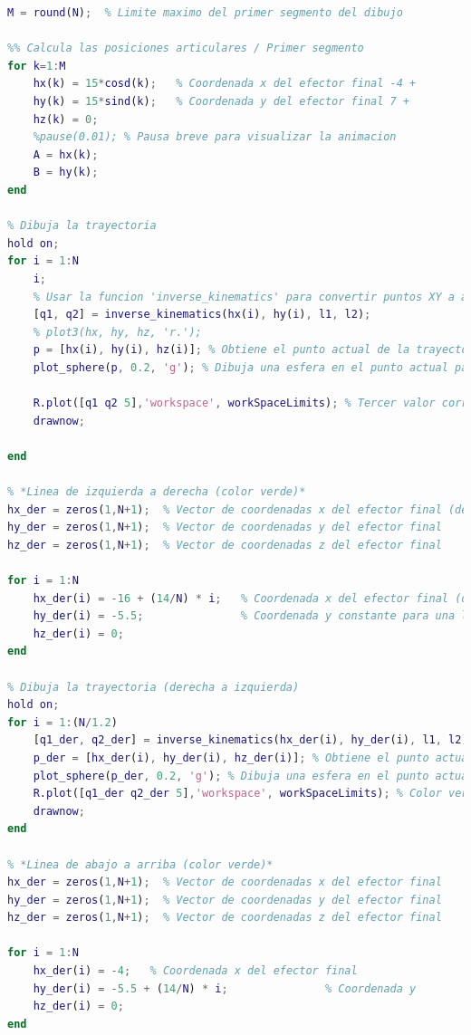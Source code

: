 \documentclass[final]{foresj}
\begin{document}
\begin{lstlisting}[language=Matlab]
M = round(N);  % Limite maximo del primer segmento del dibujo

%% Calcula las posiciones articulares / Primer segmento
for k=1:M
    hx(k) = 15*cosd(k);   % Coordenada x del efector final -4 + 
    hy(k) = 15*sind(k);   % Coordenada y del efector final 7 + 
    hz(k) = 0;
    %pause(0.01); % Pausa breve para visualizar la animacion
    A = hx(k);
    B = hy(k);
end

% Dibuja la trayectoria
hold on;
for i = 1:N
    i;
    % Usar la funcion 'inverse_kinematics' para convertir puntos XY a angulos de junta
    [q1, q2] = inverse_kinematics(hx(i), hy(i), l1, l2); 
    % plot3(hx, hy, hz, 'r.');
    p = [hx(i), hy(i), hz(i)]; % Obtiene el punto actual de la trayectoria
    plot_sphere(p, 0.2, 'g'); % Dibuja una esfera en el punto actual para visualizar la trayectoria

    R.plot([q1 q2 5],'workspace', workSpaceLimits); % Tercer valor corresponde a d3 que es cero
    drawnow;

end

% *Linea de izquierda a derecha (color verde)*
hx_der = zeros(1,N+1);  % Vector de coordenadas x del efector final (derecha a izquierda)
hy_der = zeros(1,N+1);  % Vector de coordenadas y del efector final
hz_der = zeros(1,N+1);  % Vector de coordenadas z del efector final

for i = 1:N
    hx_der(i) = -16 + (14/N) * i;   % Coordenada x del efector final (derecha a izquierda)
    hy_der(i) = -5.5;               % Coordenada y constante para una linea recta
    hz_der(i) = 0;
end

% Dibuja la trayectoria (derecha a izquierda)
hold on;
for i = 1:(N/1.2)
    [q1_der, q2_der] = inverse_kinematics(hx_der(i), hy_der(i), l1, l2); 
    p_der = [hx_der(i), hy_der(i), hz_der(i)]; % Obtiene el punto actual de la trayectoria
    plot_sphere(p_der, 0.2, 'g'); % Dibuja una esfera en el punto actual para visualizar la trayectoria (color verde)
    R.plot([q1_der q2_der 5],'workspace', workSpaceLimits); % Color verde
    drawnow;
end

% *Linea de abajo a arriba (color verde)*
hx_der = zeros(1,N+1);  % Vector de coordenadas x del efector final
hy_der = zeros(1,N+1);  % Vector de coordenadas y del efector final
hz_der = zeros(1,N+1);  % Vector de coordenadas z del efector final

for i = 1:N
    hx_der(i) = -4;   % Coordenada x del efector final
    hy_der(i) = -5.5 + (14/N) * i;               % Coordenada y
    hz_der(i) = 0;
end


\end{lstlisting}
\end{document}
